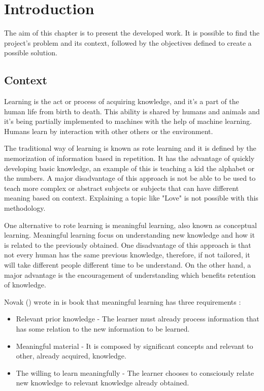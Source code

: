 %
\chapter{Introduction} %
\label{chap:Chapter1} %

The aim of this chapter is to present the developed work.
It is possible to find the project's problem and its context, followed by the objectives defined to create a possible solution.

\section{Context}

Learning is the act or process of acquiring knowledge, and it's a part of the human life from birth to death.
This ability is shared by humans and animals and it's being partially implemented to machines with the help of machine learning.
Humans learn by interaction with other others or the environment.

The traditional way of learning is known as rote learning and it is defined by the memorization of information based in repetition.
It has the advantage of quickly developing basic knowledge, an example of this is teaching a kid the alphabet or the numbers.
A major disadvantage of this approach is not be able to be used to teach more complex or abstract subjects or subjects that can have different meaning based on context.
Explaining a topic like "Love" is not possible with this methodology.

One alternative to rote learning is meaningful learning, also known as conceptual learning.
Meaningful learning focus on understanding new knowledge and how it is related to the previously obtained.
One disadvantage of this approach is that not every human has the same previous knowledge, therefore, if not tailored, it will take different people different time to be understand.
On the other hand, a major advantage is the encouragement of understanding which benefits retention of knowledge.

Novak (\citeyear{novak_2012}) wrote in is book that meaningful learning has three requirements :

\begin{itemize}
    \item Relevant prior knowledge - The learner must already process information that has some relation to the new information to be learned.
    \item Meaningful material - It is composed by significant concepts and relevant to other, already acquired, knowledge.
    \item The willing to learn meaningfully - The learner chooses to consciously relate new knowledge to relevant knowledge already obtained.
\end{itemize}


